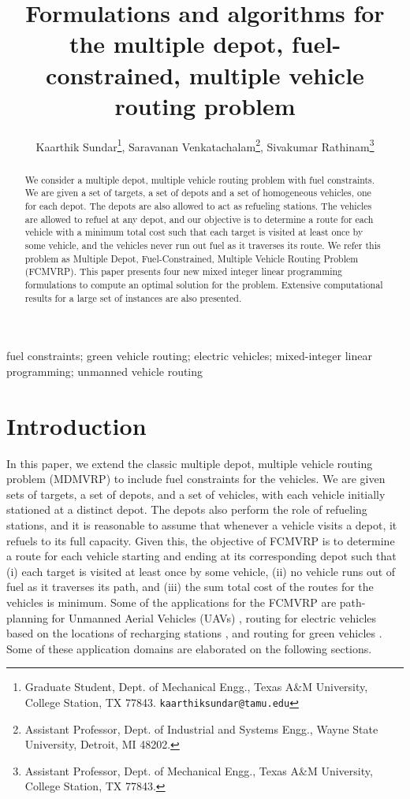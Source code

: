 \documentclass[letterpaper, 10pt, conference]{ieeeconf}
\title{\LARGE \bf
Formulations and algorithms for the multiple depot, fuel-constrained, multiple vehicle routing problem 
}
\author{Kaarthik Sundar\thanks{ Graduate Student, Dept. of Mechanical Engg., Texas A\&M University,
College Station, TX 77843. \texttt{kaarthiksundar@tamu.edu}},\;
Saravanan Venkatachalam\thanks{ Assistant Professor, Dept. of Industrial and Systems Engg., Wayne State University,
Detroit, MI 48202. \texttt{}},\;
Sivakumar Rathinam\thanks{ Assistant Professor, Dept. of Mechanical Engg., Texas A\&M University,
College Station, TX 77843.}} \;
\begin{document}
\maketitle
\thispagestyle{empty}
\pagestyle{empty}

\begin{abstract}
We consider a multiple depot, multiple vehicle routing problem with fuel constraints. We are given a set of targets, a set of depots and a set of homogeneous vehicles, one for each depot. The depots are also allowed to act as refueling stations. The vehicles are allowed to refuel at any depot, and our objective is to determine a route for each vehicle with a minimum total cost such that each target is visited at least once by some vehicle, and the vehicles never run out fuel as it traverses its route. We refer this problem as Multiple Depot, Fuel-Constrained, Multiple Vehicle Routing Problem (FCMVRP). This paper presents four new mixed integer linear programming formulations to compute an optimal solution for the problem. Extensive computational results for a large set of instances are also presented.
\end{abstract}

\begin{keywords}
    fuel constraints; green vehicle routing; electric vehicles; mixed-integer linear programming; unmanned vehicle routing
\end{keywords}

\section{Introduction}
\label{sec:intro}
In this paper, we extend the classic multiple depot, multiple vehicle routing problem (MDMVRP) to include fuel constraints for the vehicles. We are given sets of targets, a set of depots, and a set of vehicles, with each vehicle initially stationed at a distinct depot. The depots also perform the role of refueling stations, and it is reasonable to assume that whenever a vehicle visits a depot, it refuels to its full capacity. Given this, the objective of FCMVRP is to determine a route for each vehicle starting and ending at its corresponding depot such that (i) each target is visited at least once by some vehicle, (ii) no vehicle runs out of fuel as it traverses its path, and (iii) the sum total cost of the routes for the vehicles is minimum. Some of the applications for the FCMVRP are path-planning for Unmanned Aerial Vehicles (UAVs) \cite{Sundar2012, Sundar2014, Levy2014}, routing for electric vehicles based on the locations of recharging stations \cite{Schneider2014, Hiermann2014}, and routing for green vehicles \cite{Erdougan2012}. Some of these application domains are elaborated on the following sections.
\end{document}
